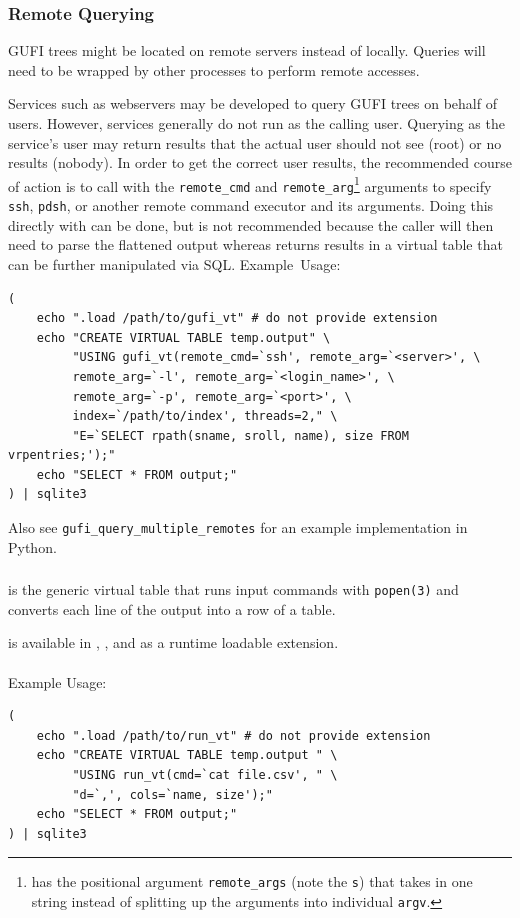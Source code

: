 \subsubsection{Remote Querying}
GUFI trees might be located on remote servers instead of
locally. Queries will need to be wrapped by other processes to perform
remote accesses.

Services such as webservers may be developed to query GUFI trees on
behalf of users. However, services generally do not run as the calling
user. Querying as the service's user may return results that the
actual user should not see (root) or no results (nobody). In order to
get the correct user results, the recommended course of action is to
call \gufivt with the \texttt{remote\_cmd} and
\texttt{remote\_arg}\footnote{\gufivtstar has the positional argument
\texttt{remote\_args} (note the \texttt{s}) that takes in one string
instead of splitting up the arguments into individual \texttt{argv}.}
arguments to specify \texttt{ssh}, \texttt{pdsh}, or another remote
command executor and its arguments. Doing this directly with
\gufiquery can be done, but is not recommended because the caller will
then need to parse the flattened output whereas \gufivt returns
results in a \sqlite virtual table that can be further manipulated via
SQL.
\newpage
Example~Usage:
\begin{verbatim}
(
    echo ".load /path/to/gufi_vt" # do not provide extension
    echo "CREATE VIRTUAL TABLE temp.output" \
         "USING gufi_vt(remote_cmd=`ssh', remote_arg=`<server>', \
         remote_arg=`-l', remote_arg=`<login_name>', \
         remote_arg=`-p', remote_arg=`<port>', \
         index=`/path/to/index', threads=2," \
         "E=`SELECT rpath(sname, sroll, name), size FROM vrpentries;');"
    echo "SELECT * FROM output;"
) | sqlite3
\end{verbatim}

Also see \texttt{gufi\_query\_multiple\_remotes} for an example
implementation in Python.

\subsubsection{\runvt}
\runvt is the generic virtual table that runs input commands with
\texttt{popen(3)} and converts each line of the output into a row of a
\sqlite table.

\runvt is available in \gufiquery, \gufisqlite, and as a runtime
loadable extension.
\\\\
Example Usage:
\begin{verbatim}
(
    echo ".load /path/to/run_vt" # do not provide extension
    echo "CREATE VIRTUAL TABLE temp.output " \
         "USING run_vt(cmd=`cat file.csv', " \
         "d=`,', cols=`name, size');"
    echo "SELECT * FROM output;"
) | sqlite3
\end{verbatim} 

